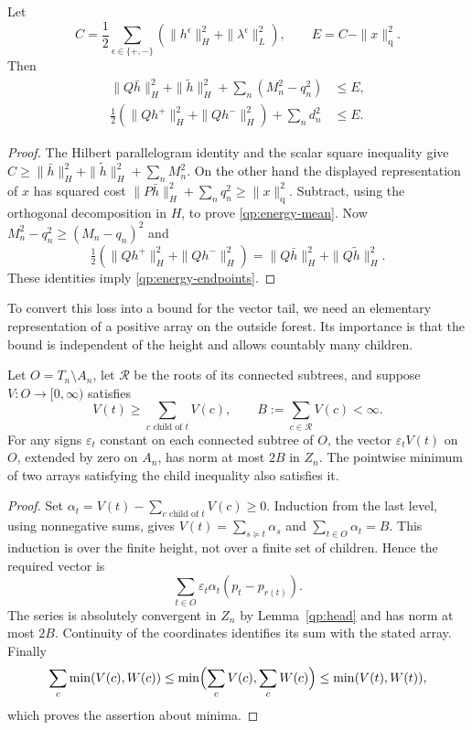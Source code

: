 \begin{lemma}\label{qp:energy}
Let
\[
 C=\frac12\sum_{\epsilon\in\{+,-\}}
       (\|h^\epsilon\|_H^2+\|\lambda^\epsilon\|_L^2),
 \qquad E=C-\|x\|_{\mathrm q}^2.
\]
Then
\begin{align}
 \|Q\bar h\|_H^2+\|\widetilde h\|_H^2+
       \sum_n(M_n^2-q_n^2)&\le E,\label{qp:energy-mean}\\
 \tfrac12(\|Qh^+\|_H^2+\|Qh^-\|_H^2)+
       \sum_n d_n^2&\le E.\label{qp:energy-endpoints}
\end{align}
\end{lemma}

\begin{proof}
The Hilbert parallelogram identity and the scalar square inequality
give
$C\ge\|\bar h\|_H^2+\|\widetilde h\|_H^2+\sum_nM_n^2$.
On the other hand the displayed representation of $x$ has squared
cost $\|P\bar h\|_H^2+\sum_nq_n^2\ge\|x\|_{\mathrm q}^2$.
Subtract, using the orthogonal decomposition in $H$, to prove
\eqref{qp:energy-mean}.  Now
$M_n^2-q_n^2\ge(M_n-q_n)^2$ and
\[
 \tfrac12(\|Qh^+\|_H^2+\|Qh^-\|_H^2)
 =\|Q\bar h\|_H^2+\|Q\widetilde h\|_H^2.
\]
These identities imply \eqref{qp:energy-endpoints}.
\end{proof}

To convert this loss into a bound for the vector tail, we need an
elementary representation of a positive array on the outside forest.
Its importance is that the bound is independent of the height and
allows countably many children.

\begin{lemma}\label{qp:flow}
Let $O=T_n\setminus A_n$, let $\mathcal R$ be the roots of its
connected subtrees, and suppose $V:O\to[0,\infty)$ satisfies
\[
 V(t)\ge\sum_{c\text{ child of }t}V(c),\qquad
 B:=\sum_{c\in\mathcal R}V(c)<\infty.
\]
For any signs $\varepsilon_t$ constant on each connected subtree of
$O$, the vector $\varepsilon_tV(t)$ on $O$, extended by zero on
$A_n$, has norm at most $2B$ in $Z_n$.  The pointwise minimum of two
arrays satisfying the child inequality also satisfies it.
\end{lemma}

\begin{proof}
Set $\alpha_t=V(t)-\sum_{c\text{ child of }t}V(c)\ge0$.
Induction from the last level, using nonnegative sums, gives
$V(t)=\sum_{s\succeq t}\alpha_s$ and
$\sum_{t\in O}\alpha_t=B$.  This induction is over the finite
height, not over a finite set of children.  Hence the required vector is
\[
 \sum_{t\in O}\varepsilon_t\alpha_t
                      (p_t-p_{r(t)}).
\]
The series is absolutely convergent in $Z_n$ by Lemma~\ref{qp:head}
and has norm at most $2B$.  Continuity of the coordinates identifies
its sum with the stated array.  Finally
\[
 \sum_c\min(V(c),W(c))
 \le\min\Bigl(\sum_cV(c),\sum_cW(c)\Bigr)
 \le\min(V(t),W(t)),
\]
which proves the assertion about minima.
\end{proof}


